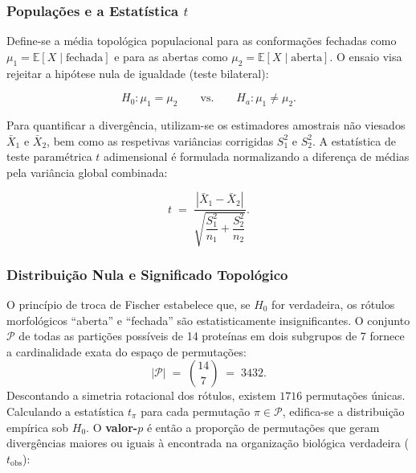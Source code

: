 \documentclass[12pt, a4paper]{article}
\begin{document}
\subsubsection{Populações e a Estatística \texorpdfstring{$t$}{t}}

Define-se a média topológica populacional para as conformações fechadas como $\mu_{1} = \mathbb{E}[X \mid \text{fechada}]$ e para as abertas como $\mu_{2} = \mathbb{E}[X \mid \text{aberta}]$. O ensaio visa rejeitar a hipótese nula de igualdade (teste bilateral):
 
\begin{equation*} \label{eq:hipoteses}
  H_{0} : \mu_{1} = \mu_{2} \qquad \text{vs.} \qquad H_{a} : \mu_{1} \neq \mu_{2}.
\end{equation*}

Para quantificar a divergência, utilizam-se os estimadores amostrais não viesados $\bar{X}_{1}$ e $\bar{X}_{2}$, bem como as respetivas variâncias corrigidas $S_1^2$ e $S_2^2$. A estatística de teste paramétrica $t$ adimensional é formulada normalizando a diferença de médias pela variância global combinada:
 
\begin{equation*} \label{eq:estatistica_t}
    t \;=\; \frac{|\bar{X}_{1} - \bar{X}_{2}|}%
    {\displaystyle\sqrt{\dfrac{S_1^2}{n_{1}} + \dfrac{S_2^2}{n_{2}}}}.
\end{equation*}
 
\subsubsection{Distribuição Nula e Significado Topológico}
 
O princípio de troca de Fischer estabelece que, se $H_{0}$ for verdadeira, os rótulos morfológicos ``aberta'' e ``fechada'' são estatisticamente insignificantes. O conjunto $\mathcal{P}$ de todas as partições possíveis de 14 proteínas em dois subgrupos de 7 fornece a cardinalidade exata do espaço de permutações:
\begin{equation*}
  |\mathcal{P}| \;=\; \binom{14}{7} \;=\; 3432.
\end{equation*}
Descontando a simetria rotacional dos rótulos, existem $1716$ permutações únicas. Calculando a estatística $t_{\pi}$ para cada permutação $\pi \in \mathcal{P}$, edifica-se a distribuição empírica sob $H_0$. O \textbf{valor-$p$} é então a proporção de permutações que geram divergências maiores ou iguais à encontrada na organização biológica verdadeira ($t_{\text{obs}}$):
 
\end{document}
